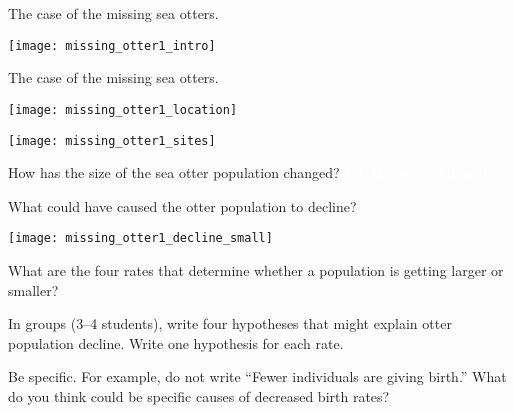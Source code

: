 \documentclass[t]{beamer}
\begin{document}
\begin{frame}{The case of the missing sea otters.}

	\centering\texttt{[image: missing\_otter1\_intro]}
	
\end{frame}
%
{
\begin{frame}[t]{The case of the missing sea otters.}

	\texttt{[image: missing\_otter1\_location]}
	
	
\end{frame}
}
%
\begin{frame}

	\centering\texttt{[image: missing\_otter1\_sites]}
	
\end{frame}
%
{
\begin{frame}[b]{How has the size of the sea otter population changed?}
	\hfill \tiny \textcolor{white}{J.J. Harrison, Wikimedia, }
\end{frame}
}
%
\begin{frame}[t]{What could have caused the otter population to decline?}

	\begin{multicols}{2}
	
	\texttt{[image: missing\_otter1\_decline\_small]}

	\columnbreak
	
	What are the four rates that determine whether 
	a population is getting larger or smaller?

	\vspace*{\baselineskip}

	In groups (3–4 students), write four hypotheses that might 
	explain otter population decline. Write one hypothesis
	for each rate. 

	\vspace*{\baselineskip}

	Be specific. For example, do not write “Fewer 
	individuals are giving birth.”  What do you think 
	could be specific causes of decreased birth rates?

	\end{multicols}
		
\end{frame}
\end{document}
